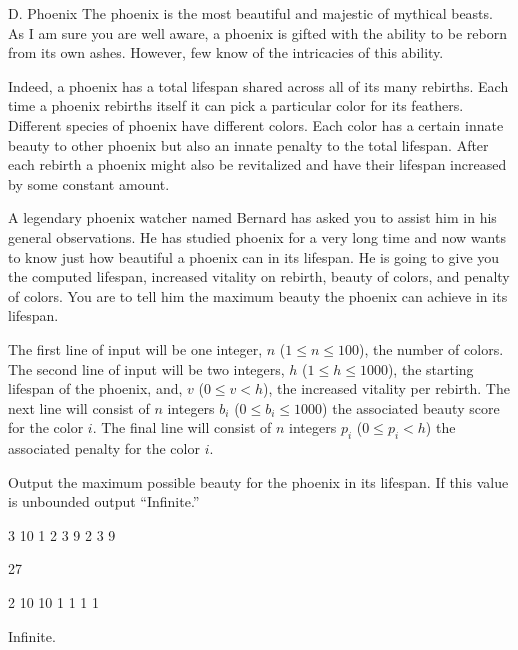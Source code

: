 \begin{problem}{D. Phoenix}
The phoenix is the most beautiful and majestic of mythical beasts.
As I am sure you are well aware, a phoenix is gifted with the ability to be reborn from its own ashes.
However, few know of the intricacies of this ability.

Indeed, a phoenix has a total lifespan shared across all of its many rebirths.
Each time a phoenix rebirths itself it can pick a particular color for its feathers.
Different species of phoenix have different colors.
Each color has a certain innate beauty to other phoenix but also an innate penalty to the total lifespan.
After each rebirth a phoenix might also be revitalized and have their lifespan increased by some constant amount.

A legendary phoenix watcher named Bernard has asked you to assist him in his general observations.
He has studied phoenix for a very long time and now wants to know just how beautiful a phoenix can in its lifespan.
He is going to give you the computed lifespan, increased vitality on rebirth, beauty of colors, and penalty of colors.
You are to tell him the maximum beauty the phoenix can achieve in its lifespan.
\end{problem}

\begin{formalin}
The first line of input will be one integer, $n$ ($1 \leq n \leq 100$), the number of colors.
The second line of input will be two integers, $h$ ($1 \leq h \leq 1000$), the starting lifespan of the phoenix, and, $v$ ($0 \leq v < h$), the increased vitality per rebirth.
The next line will consist of $n$ integers $b_i$ ($0 \leq b_i \leq 1000$) the associated beauty score for the color $i$.
The final line will consist of $n$ integers $p_i$ ($0 \leq p_i < h$) the associated penalty for the color $i$.
\end{formalin}

\begin{formalout}
Output the maximum possible beauty for the phoenix in its lifespan.
If this value is unbounded output ``Infinite.''
\end{formalout}

\begin{datain}
3
10 1
2 3 9
2 3 9
\end{datain}
\begin{dataout}
27
\end{dataout}

\begin{datain}
2
10 10
1 1
1 1
\end{datain}
\begin{dataout}
Infinite.
\end{dataout}
